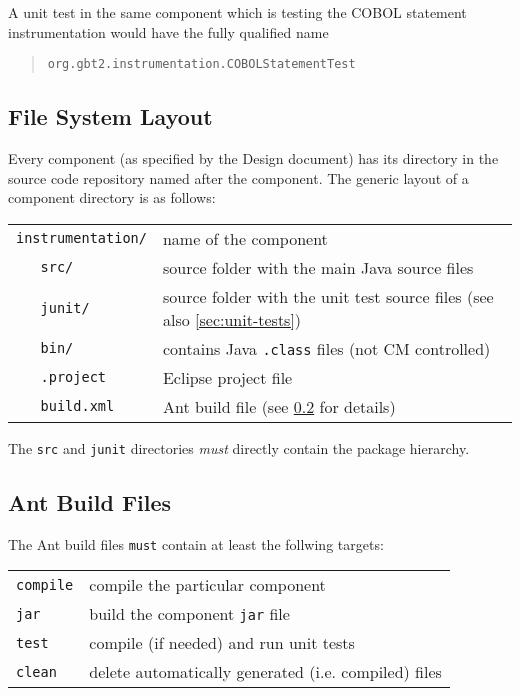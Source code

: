 \documentclass[a4paper,12pt,liststotoc,DIV12]{scrartcl}
\begin{document}
A unit
test in the same component which is testing the COBOL statement
instrumentation would have the fully qualified name
\begin{quote}
  \texttt{org.gbt2.instrumentation.COBOLStatementTest}
\end{quote}

\subsection{File System Layout}
\label{sec:fs-layout}

Every component (as specified by the Design document) has its
directory in the source code repository named after the component. The
generic layout of a component directory is as follows:

\begin{tabular}{ll}
  \verb!instrumentation/! & name of the component\\
  \verb!   src/! & source folder with the main Java source files\\
  \verb!   junit/! & source folder with the unit test source files (see also \ref{sec:unit-tests})\\
  \verb!   bin/! & contains Java \texttt{.class} files (not CM controlled)\\
  \verb!   .project! & Eclipse project file\\
  \verb!   build.xml! & Ant build file (see \ref{sec:ant-build-files} for details)\\  
\end{tabular}

The \texttt{src} and \texttt{junit} directories \emph{must} directly contain
the package hierarchy.

\subsection{Ant Build Files}
\label{sec:ant-build-files}

The Ant build files \texttt{must} contain at least the follwing targets:

\begin{tabular}{ll}
  \texttt{compile} & compile the particular component\\
  \texttt{jar} & build the component \texttt{jar} file\\
  \texttt{test} & compile (if needed) and run unit tests\\
  \texttt{clean} & delete automatically generated (i.e. compiled) files\\
\end{tabular}
\end{document}
